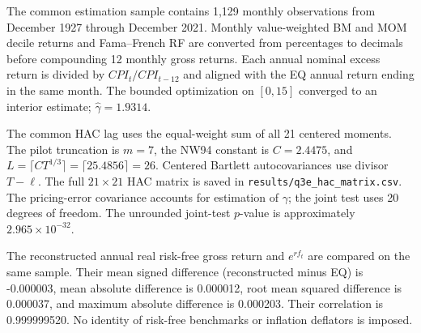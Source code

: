 The common estimation sample contains 1,129 monthly observations from December 1927 through December 2021.
Monthly value-weighted BM and MOM decile returns and Fama--French RF are
converted from percentages to decimals before compounding 12 monthly gross returns.
Each annual nominal excess return is divided by $CPI_t/CPI_{t-12}$ and
aligned with the EQ annual return ending in the same month.
The bounded optimization on $[0,15]$ converged to an interior estimate; $\hat\gamma=1.9314$.

The common HAC lag uses the equal-weight sum of all 21 centered moments.
The pilot truncation is $m=7$, the NW94 constant is $C=2.4475$,
and $L=\lceil CT^{1/3}\rceil=\lceil 25.4856\rceil=26$.
Centered Bartlett autocovariances use divisor $T-\ell$.
The full $21\times21$ HAC matrix is saved in \texttt{results/q3e\_hac\_matrix.csv}.
The pricing-error covariance accounts for estimation of $\gamma$; the joint test uses 20 degrees of freedom.
The unrounded joint-test $p$-value is approximately $2.965\times10^{-32}$.

The reconstructed annual real risk-free gross return and $e^{rf_t}$ are compared on the same sample.
Their mean signed difference (reconstructed minus EQ) is -0.000003,
mean absolute difference is 0.000012,
root mean squared difference is 0.000037,
and maximum absolute difference is 0.000203.
Their correlation is 0.999999520.
No identity of risk-free benchmarks or inflation deflators is imposed.
